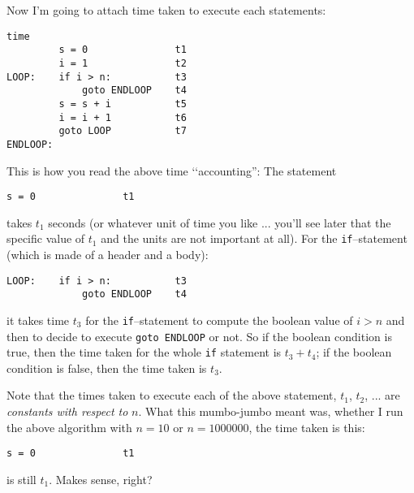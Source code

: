 Now I'm going to attach time taken to execute each statements:
\begin{Verbatim}[frame=single,fontsize=\footnotesize]
                             time
         s = 0               t1 
         i = 1               t2 
LOOP:    if i > n:           t3  
             goto ENDLOOP    t4
         s = s + i           t5
         i = i + 1           t6
         goto LOOP           t7
ENDLOOP:
\end{Verbatim}
This is how you read the above time \lq\lq accounting'':
The statement 
\begin{Verbatim}[frame=single,fontsize=\footnotesize]
         s = 0               t1
\end{Verbatim}
takes $t_1$ seconds (or whatever unit of time
you like ... you'll see later that the specific value of 
$t_1$ and the units are not important at all).
For the \verb!if!--statement
(which is made of a header and a body):
\begin{Verbatim}[frame=single,fontsize=\footnotesize]
LOOP:    if i > n:           t3  
             goto ENDLOOP    t4
\end{Verbatim}
it takes time $t_3$ for the \verb!if!--statement
to compute the boolean value of $i > n$ and then to decide
to execute \verb!goto ENDLOOP! or not.
So if the boolean condition is true, then the time taken for the 
whole \verb!if! statement is $t_3 + t_4$;
if the boolean condition is false, then the time taken 
is $t_3$.

Note that the times taken to execute each of the above
statement, $t_1$, $t_2$, ... are
\textit{constants with respect to} $n$.
What this mumbo-jumbo meant was, 
whether I run the above algorithm
with $n = 10$ or $n = 1000000$, 
the time taken is this:
\begin{Verbatim}[frame=single,fontsize=\footnotesize]
         s = 0               t1
\end{Verbatim}
is still $t_1$.
Makes sense, right?

